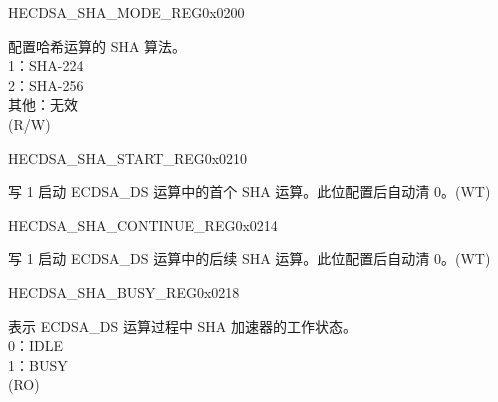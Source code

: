 \begin{register}{H}{ECDSA\_SHA\_MODE\_REG}{0x0200}\label{regdesc:ECDSASHAMODEREG}
%
%
\regnewline%
\begin{regdesc}\begin{reglist}
\label{fielddesc:ECDSASHAMODE}\item [ECDSA\_SHA\_MODE] 配置哈希运算的 SHA 算法。\\
1：SHA-224\\
2：SHA-256\\
其他：无效\\
(R/W)
\end{reglist}\end{regdesc}
\end{register}


\begin{register}{H}{ECDSA\_SHA\_START\_REG}{0x0210}\label{regdesc:ECDSASHASTARTREG}
%
%
\regnewline%
\begin{regdesc}\begin{reglist}
\label{fielddesc:ECDSASHASTART}\item [ECDSA\_SHA\_START] 写 1 启动 ECDSA\_DS 运算中的首个 SHA 运算。此位配置后自动清 0。(WT)
\end{reglist}\end{regdesc}
\end{register}


\begin{register}{H}{ECDSA\_SHA\_CONTINUE\_REG}{0x0214}\label{regdesc:ECDSASHACONTINUEREG}
%
%
\regnewline%
\begin{regdesc}\begin{reglist}
\label{fielddesc:ECDSASHACONTINUE}\item [ECDSA\_SHA\_CONTINUE] 写 1 启动 ECDSA\_DS 运算中的后续 SHA 运算。此位配置后自动清 0。(WT)
\end{reglist}\end{regdesc}
\end{register}


\begin{register}{H}{ECDSA\_SHA\_BUSY\_REG}{0x0218}\label{regdesc:ECDSASHABUSYREG}
%
%
\regnewline%
\begin{regdesc}\begin{reglist}
\label{fielddesc:ECDSASHABUSY}\item [ECDSA\_SHA\_BUSY] 表示 ECDSA\_DS 运算过程中 SHA 加速器的工作状态。\\
0：IDLE\\
1：BUSY\\
(RO)
\end{reglist}\end{regdesc}
\end{register}


